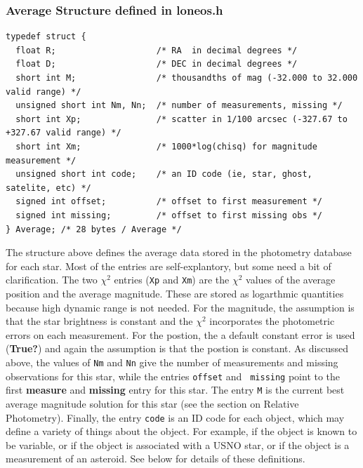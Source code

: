 \documentclass{article}
\newcommand{\note}[1]{({\bf #1})}
\begin{document}
\subsubsection*{Average Structure defined in loneos.h}
{\footnotesize
\begin{verbatim}
typedef struct {
  float R;                    /* RA  in decimal degrees */
  float D;                    /* DEC in decimal degrees */
  short int M;                /* thousandths of mag (-32.000 to 32.000 valid range) */
  unsigned short int Nm, Nn;  /* number of measurements, missing */
  short int Xp;               /* scatter in 1/100 arcsec (-327.67 to +327.67 valid range) */
  short int Xm;               /* 1000*log(chisq) for magnitude measurement */
  unsigned short int code;    /* an ID code (ie, star, ghost, satelite, etc) */
  signed int offset;          /* offset to first measurement */
  signed int missing;         /* offset to first missing obs */
} Average; /* 28 bytes / Average */
\end{verbatim} }
The structure above defines the average data stored in the photometry
database for each star.  Most of the entries are self-explantory, but
some need a bit of clarification.  The two $\chi^2$ entries ({\tt Xp}
and {\tt Xm}) are the $\chi^2$ values of the average position and the
average magnitude.  These are stored as logarthmic quantities because
high dynamic range is not needed.  For the magnitude, the assumption
is that the star brightness is constant and the $\chi^2$ incorporates
the photometric errors on each measurement.  For the postion, the
a default constant error is used \note{True?} and again the assumption
is that the postion is constant.  As discussed above, the values of
{\tt Nm} and {\tt Nn} give the number of measurements and missing
observations for this star, while the entries {\tt offset} and {\tt
  missing} point to the first {\bf measure} and {\bf missing} entry
for this star.  The entry {\tt M} is the current best average
magnitude solution for this star (see the section on Relative
Photometry).  Finally, the entry {\tt code} is an ID code for each
object, which may define a variety of things about the object.  For
example, if the object is known to be variable, or if the object is
associated with a USNO star, or if the object is a measurement of an
asteroid.  See below for details of these definitions.
\end{document}
